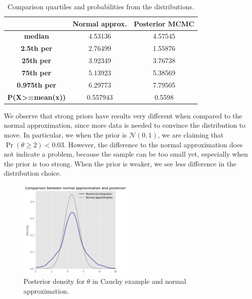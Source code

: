 \documentclass[a4paper,10pt, notitlepage]{report}
\theoremstyle{plain}
\newcommand{\pr}{\operatorname{Pr}} %
\begin{document}
\begin{table}[H]
    \centering
    \begin{tabular}{|c|c|c|}
    \hline
    \textbf{}                           & \textbf{Normal approx.} & \textbf{Posterior MCMC} \\ \hline
    \textbf{median}                     & 4.53136                 & 4.57545                \\ \hline
    \textbf{2.5th per}                  & 2.76499                 & 1.55876                 \\ \hline
    \textbf{25th per}                   & 3.92349                 & 3.76738                 \\ \hline
    \textbf{75th per}                   & 5.13923                 & 5.38569                 \\ \hline
    \textbf{0.975th per}                & 6.29773                 & 7.79505                  \\ \hline
    \textbf{P(X\textgreater{}=mean(x))} & 0.557943                & 0.5598                  \\ \hline
    \end{tabular}
    \caption{Comparison quartiles and probabilities from the distributions.}
    \label{tb:quantiles-probs}
\end{table}

We observe that strong priors have results very different when compared to the normal
approximation, since more data is needed to convince the distribution to move.
In particular, we when the prior is $\mathcal{N}(0,1)$, we are claiming that
$\pr(\theta \ge 2) < 0.03$. However, the difference to the normal approximation does not indicate a problem, because the sample
can be too small yet, especially when the prior is too strong. When the prior
is weaker, we see less difference in the distribution choice. 

\begin{figure}
    \centering
    \includegraphics[width=0.5\textwidth]{../../images/comparison-simple-case.png}
    \caption{Posterior density for $\theta$ in Cauchy example and normal approximation.}
    \label{fig:comparison-normal-posteriori}
\end{figure}
\end{document}
